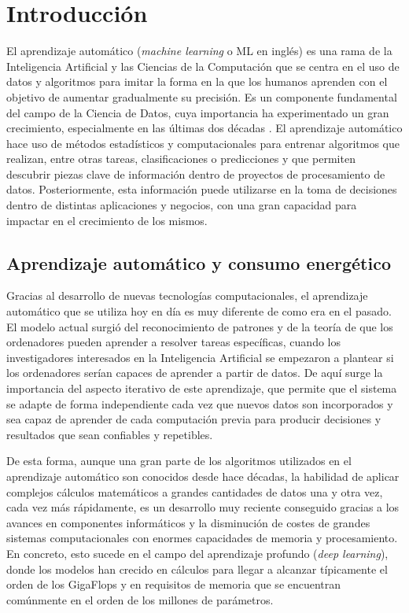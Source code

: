 \chapter{Introducción}
\label{sec:intro}

El aprendizaje automático (\emph{machine learning} o ML en inglés) es una rama de la Inteligencia Artificial y las Ciencias de la Computación que se centra en el uso de datos y algoritmos para imitar la forma en la que los humanos aprenden con el objetivo de aumentar gradualmente su precisión.
Es un componente fundamental del campo de la Ciencia de Datos, cuya importancia ha experimentado un gran crecimiento, especialmente en las últimas dos décadas \cite{cleveland2001}. 
El aprendizaje automático hace uso de métodos estadísticos y computacionales para entrenar algoritmos que realizan, entre otras tareas, clasificaciones o predicciones y que permiten descubrir piezas clave de información dentro de proyectos de procesamiento de datos. 
Posteriormente, esta información puede utilizarse en la toma de decisiones dentro de distintas aplicaciones y negocios, con una gran capacidad para impactar en el crecimiento de los mismos.

\section{Aprendizaje automático y consumo energético}

Gracias al desarrollo de nuevas tecnologías computacionales, el aprendizaje automático que se utiliza hoy en día es muy diferente de como era en el pasado.
El modelo actual surgió del reconocimiento de patrones y de la teoría de que los ordenadores pueden aprender a resolver tareas específicas, cuando los investigadores interesados en la Inteligencia Artificial se empezaron a plantear si los ordenadores serían capaces de aprender a partir de datos.
De aquí surge la importancia del aspecto iterativo de este aprendizaje, que permite que el sistema se adapte de forma independiente cada vez que nuevos datos son incorporados y sea capaz de aprender de cada computación previa para producir decisiones y resultados que sean confiables y repetibles.

De esta forma, aunque una gran parte de los algoritmos utilizados en el aprendizaje automático son conocidos desde hace décadas, la habilidad de aplicar complejos cálculos matemáticos a grandes cantidades de datos una y otra vez, cada vez más rápidamente, es un desarrollo muy reciente conseguido gracias a los avances en componentes informáticos y la disminución de costes de grandes sistemas computacionales con enormes capacidades de memoria y procesamiento.
En concreto, esto sucede en el campo del aprendizaje profundo (\emph{deep learning}), donde los modelos han crecido en cálculos para llegar a alcanzar típicamente el orden de los GigaFlops y en requisitos de memoria que se encuentran comúnmente en el orden de los millones de parámetros.

